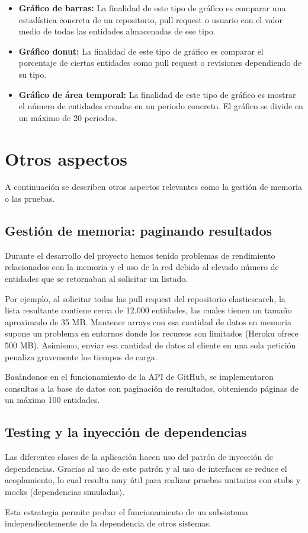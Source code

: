 \begin{itemize}
\tightlist
	\item \textbf{Gráfico de barras:} La finalidad de este tipo de gráfico es comparar una estadística concreta de un repositorio, pull request o usuario con el valor medio de todas las entidades almacenadas de ese tipo.
	\item \textbf{Gráfico donut:} La finalidad de este tipo de gráfico es comparar el porcentaje de ciertas entidades como pull request o revisiones dependiendo de su tipo.
	\item \textbf{Gráfico de área temporal:} La finalidad de este tipo de gráfico es mostrar  el número de entidades creadas en un periodo concreto. El gráfico se divide en un máximo de 20 periodos.
\end{itemize}



\section{Otros aspectos}

A continuación se describen otros aspectos relevantes como la gestión de memoria o las pruebas.

\subsection{Gestión de memoria: paginando resultados}

Durante el desarrollo del proyecto hemos tenido problemas de rendimiento relacionados con la memoria y el uso de la red debido al elevado número de entidades que se retornaban al solicitar un listado.

Por ejemplo, al solicitar todas las pull request del repositorio elasticsearch, la lista resultante contiene cerca de 12.000 entidades, las cuales tienen un tamaño aproximado de 35 MB. Mantener arrays con esa cantidad de datos en memoria supone un problema en entornos donde los recursos son limitados (Heroku ofrece 500 MB). Asimismo, enviar esa cantidad de datos al cliente en una sola petición penaliza gravemente los tiempos de carga.

Basándonos en el funcionamiento de la API de GitHub, se implementaron consultas a la base de datos con paginación de resultados, obteniendo páginas de un máximo 100 entidades.

\subsection{Testing y la inyección de dependencias}

Las diferentes clases de la aplicación hacen uso del patrón de inyección de dependencias. Gracias al uso de este patrón y al uso de interfaces se reduce el acoplamiento, lo cual resulta muy útil para realizar pruebas unitarias con stubs y mocks (dependencias simuladas).

Esta estrategia permite probar el funcionamiento de un subsistema independientemente de la dependencia de otros sistemas.

